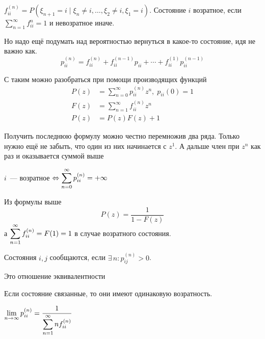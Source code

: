\documentclass[12pt, timbord]{../../../notes}
\begin{document}
\begin{defn}\label{defn:proc::markchain::ret}
  $f_{ii}^{(n)} = P(\xi_{n+1} = i \mid \xi_{n} \neq i, \dotsc,\xi_2 \neq i, \xi_1 = i) $. Состояние $i$
  возратное, если $\sum_{n=1}^\infty f_{ii}^n = 1$ и невозратное иначе.
\end{defn}

Но надо ещё подумать над вероятностью вернуться в какое-то состояние, идя не важно как.
\[
  p_{ii}^{(n)} = f_{ii}^{(n)} + f_{ii}^{(n-1)} p_{ii} + \dotsb + f_{ii}^{(1)}p_{ii}^{(n-1)}
\]

С таким можно разобраться при помощи производящих функций
\begin{align*}
  P(z) &= \sum_{n=0}^\infty p_{ii}^{(n)} z^n, \; p_{ii} (0) = 1 \\
  F(z) &= \sum_{n=1}^\infty f_{ii}^{(n)} z^n\\
  P(z) &= P(z) F(z) + 1 
\end{align*}

Получить последнюю формулу можно честно перемножив два ряда. Только нужно ещё не забыть, что один из
них начинается с $z^1$. А дальше член при $z^n$ как раз и оказывается суммой выше

\begin{prop}\label{prop:proc::markchain::retcrit}
  $i$~--- возратное $ \Leftrightarrow \displaystyle\sum_{n=0}^\infty p_{ii}^{(n)} = + \infty$
\end{prop}
\begin{itlproof}
  Из формулы выше
  \[
    P(z) = \frac{1}{1-F(z)}
  \]
  а $\displaystyle\sum_{n=1}^\infty f_{ii}^{(n)} = F(1) = 1$ в случае возратного состояния.
\end{itlproof}

\begin{defn}\label{defn:proc::markchain::conn}
  Состояния $i,j$ сообщаются, если $\exists\, n\colon p_{ij}^{(n)} > 0$.
\end{defn}
\begin{rem}\label{rem:proc::indep::conn}
  Это отношение эквивалентности
\end{rem}

\begin{prop}\label{prop:proc::indep::eqret}
  Если состояние связанные, то они имеют одинаковую возратность.
\end{prop}

\begin{thrm}\label{thrm:proc::indep::time}
  $\displaystyle \lim_{n\to \infty} p_{ii}^{(n)} = \frac{1}{\displaystyle\sum\limits_{n=1}^\infty n
  f_{ii}^{(n)}}$
\end{thrm}
\end{document}
